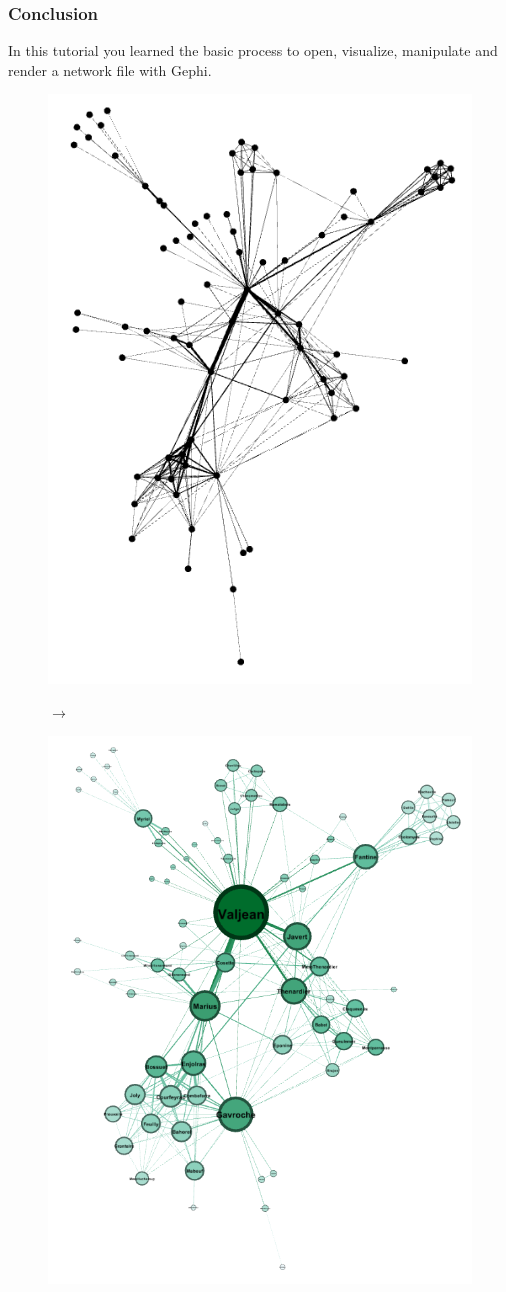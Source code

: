 \documentclass[10pt]{beamer}
\begin{document}
\begin{frame}
\frametitle{Conclusion}
In this tutorial you learned the basic process to open, visualize, manipulate and render
a network file with Gephi.
\begin{figure}
\centering
\begin{minipage}{.3\textwidth}
\centering
\includegraphics[width=0.8\linewidth]{figures/network_with_layout_controlled.png}
\end{minipage}
$\rightarrow$
\begin{minipage}{.3\textwidth}
\centering
\includegraphics[width=0.8\linewidth]{figures/network_with_labels.png}

\end{minipage}
\end{figure}
\end{frame}
\end{document}
